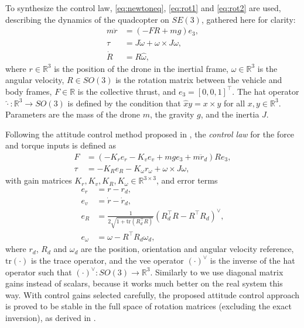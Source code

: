 To synthesize the control law, \eqref{eq:newtoneq}, \eqref{eq:rot1} and \eqref{eq:rot2} are used, describing the dynamics of the quadcopter on $SE(3)$, gathered here for clarity:
\begin{subequations}
\begin{align}
    m\ddot{r}& = (-FR + mg)e_3,\label{eq:geom_tran}\\
    \tau& = J\dot\omega + \omega\times J \omega,\\
    \dot R &= R\hat{\omega},
\end{align}
\end{subequations}
where $r\in\mathbb{R}^3$ is the position of the drone in the inertial frame, $\omega\in\mathbb{R}^3$ is the angular velocity, $R\in SO(3)$ is the rotation matrix between the vehicle and body frames, $F\in\mathbb{R}$ is the collective thrust, and $e_3=[ 0, 0, 1 ]^\top$. The hat operator $\hat{\cdot}:\mathbb{R}^3\rightarrow SO(3)$ is defined by the condition that $\hat{x}y = x\times y$ for all $x,y\in \mathbb{R}^3$. Parameters are the mass of the drone $m$, the gravity $g$, and the inertia $J$.

Following the attitude control method proposed in \cite{lelemc2010}, the \textit{control law} for the force and torque inputs is defined as
\begin{subequations}\label{eq:geomlaw}
\begin{align}
    F&= (-K_r e_r - K_v e_v + m g e_3+m \ddot r_d) R e_3,\\
    \tau &= -K_R e_R - K_\omega r_\omega + \omega\times J \omega,\label{eq:geomtau}
\end{align}
\end{subequations}
with gain matrices $K_r, K_v, K_R, K_\omega \in \mathbb{R}^{3\times 3}$, and error terms
\begin{subequations}\label{eq:geomerrors}
\begin{align}
    e_r &= r-r_d,\\
    e_v &= \dot r - \dot r_d,\\
    e_R &= \frac{1}{2\sqrt{1+\mathrm{tr}\left( R_d^\top R \right)}}\left(R_d^\top R - R^\top R_d\right)^\vee,\\
    e_\omega &= \omega - R^\top R_d\omega_d,
\end{align}
\end{subequations}
where $r_d$, $R_d$ and $\omega_d$ are the position, orientation and angular velocity reference, $\mathrm{tr}(\cdot)$ is the trace operator, and the vee operator $(\cdot)^\vee$ is the inverse of the hat operator such that $(\cdot)^\vee:SO(3)\rightarrow \mathbb{R}^3$. Similarly to \cite{mellinger2011} we use diagonal matrix gains instead of scalars, because it works much better on the real system this way. With control gains selected carefully, the proposed attitude control approach is proved to be stable in the full space of rotation matrices (excluding the exact inversion), as derived in \cite{lelemc2010}.

